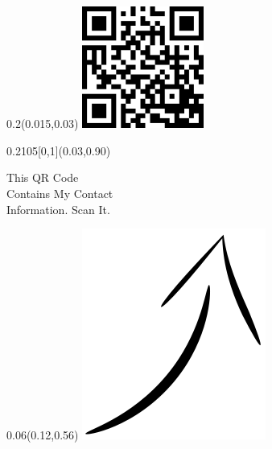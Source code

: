\documentclass[a4paper]{article}
\begin{document}

\begin{textblock}{0.2}(0.015,0.03)
  \includegraphics[width=4cm]{fig/main}
\end{textblock}

\begin{textblock}{0.2105}[0,1](0.03,0.90) 
  \begin{small}\textsf{This QR Code \\ Contains My Contact \\ Information.  Scan It.}\end{small}
\end{textblock}

\begin{textblock}{0.06}(0.12,0.56)
  \includegraphics[width=\textwidth, angle=30]{fig/arrow}
\end{textblock}
\end{document}
